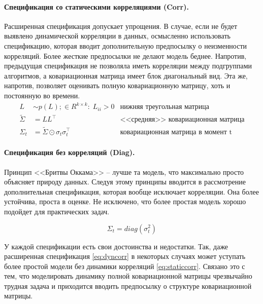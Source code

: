 \paragraph{Спецификация со статическими корреляциями (Corr).}
Расширенная спецификация допускает упрощения. В случае, если не будет выявлено динамической корреляции в данных, осмысленно использовать спецификацию, которая вводит дополнительную предпосылку о неизменности корреляций. Более жесткие предпосылки не делают модель беднее. Напротив, предыдущая спецификация не позволяла иметь корреляции между подгруппами алгоритмов, а ковариационная матрица имеет блок диагональный вид. Эта же, напротив, позволяет оценивать полную ковариационную матрицу, хоть и постоянную во времени.
\begin{align}
L &\sim p(L);\in R^{k\times k}:\; L_{ii} > 0 & \text{нижняя треугольная матрица}\nonumber\\
\tilde{\Sigma} &= LL^\top & \text{<<средняя>> ковариационная матрица}\nonumber\\
\Sigma_t &= \tilde{\Sigma} \odot \sigma_t\sigma_t^\top & \text{ковариационная матрица в момент t}\label{eq:staticcorr}
\end{align}
\paragraph{Спецификация без корреляций (Diag).}
Принцип <<Бритвы Оккама>> -- лучше та модель, что максимально просто объясняет природу данных. Следуя этому принципы вводится в рассмотрение дополнительная спецификация, которая вообще исключает корреляции. Она более устойчива, проста в оценке. Не исключено, что более простая модель хорошо подойдет для практических задач.

\begin{equation}
\Sigma_t = diag(\sigma^2_t)\label{eq:nocorr}
\end{equation}

У каждой спецификации есть свои достоинства и недостатки. Так, даже расширенная спецификация \eqref{eq:dyncorr} в некоторых случаях может уступать более простой модели без динамики корреляций \eqref{eq:staticcorr}. Связано это с тем, что моделировать динамику полной ковариационной матрицы чрезвычайно трудная задача и приходится вводить предпосылку о структуре ковариационной матрицы. 

